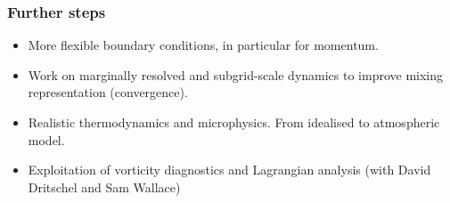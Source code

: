 \documentclass{beamer}
\def\oran#1{\color{orange} #1}
\def\re#1{\color{red}   #1}
\def\bl#1{\color{blue}  #1}
\def\pu#1{\color{purple} #1}
\begin{document}

\begin{frame}
\frametitle{Further steps}

\vspace{0.2cm}
\begin{itemize}
\item More flexible {\pu boundary conditions}, in particular for momentum.
\item Work on {\re marginally resolved and subgrid-scale dynamics} to improve mixing representation (convergence).
\item Realistic {\bl thermodynamics} and {\bl microphysics}. From idealised to atmospheric model.
\item Exploitation of {\oran vorticity diagnostics} and {\oran Lagrangian analysis} (with David Dritschel and Sam Wallace)
\end{itemize}

\centering

\end{frame}

\end{document}
